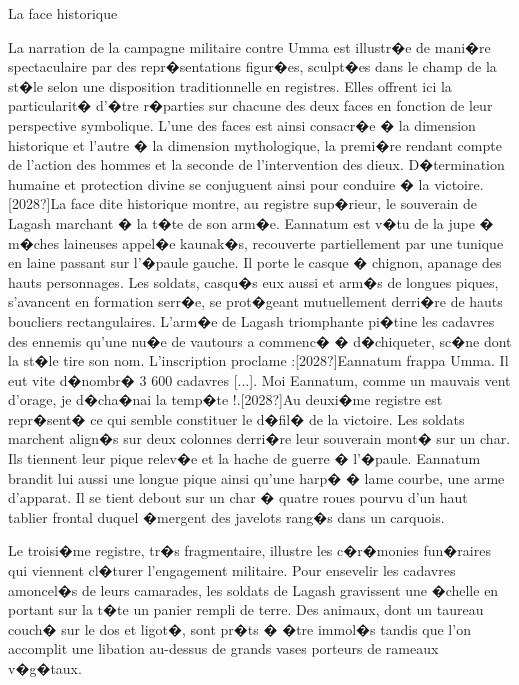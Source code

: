 \documentclass{article}
\begin{document}
La face {\textquotedbl}historique{\textquotedbl}

La narration de la campagne militaire contre Umma est illustr�e de mani�re spectaculaire par des repr�sentations figur�es, sculpt�es dans le champ de la st�le selon une disposition traditionnelle en registres. Elles offrent ici la particularit� d'�tre r�parties sur chacune des deux faces en fonction de leur perspective symbolique. L'une des faces est ainsi consacr�e � la dimension {\textquotedbl}historique{\textquotedbl} et l'autre � la dimension {\textquotedbl}mythologique{\textquotedbl}, la premi�re rendant compte de l'action des hommes et la seconde de l'intervention des dieux. D�termination humaine et protection divine se conjuguent ainsi pour conduire � la victoire.[2028?]La face dite {\textquotedbl}historique{\textquotedbl} montre, au registre sup�rieur, le souverain de Lagash marchant � la t�te de son arm�e. Eannatum est v�tu de la jupe � m�ches laineuses appel�e kaunak�s, recouverte partiellement par une tunique en laine passant sur l'�paule gauche. Il porte le casque � chignon, apanage des hauts personnages. Les soldats, casqu�s eux aussi et arm�s de longues piques, s'avancent en formation serr�e, se prot�geant mutuellement derri�re de hauts boucliers rectangulaires. L'arm�e de Lagash triomphante pi�tine les cadavres des ennemis qu'une nu�e de vautours a commenc� � d�chiqueter, sc�ne dont la st�le tire son nom. L'inscription proclame :[2028?]{\textquotedbl}Eannatum frappa Umma. Il eut vite d�nombr� 3 600 cadavres [...]. Moi Eannatum, comme un mauvais vent d'orage, je d�cha�nai la temp�te !{\textquotedbl}.[2028?]Au deuxi�me registre est repr�sent� ce qui semble constituer le d�fil� de la victoire. Les soldats marchent align�s sur deux colonnes derri�re leur souverain mont� sur un char. Ils tiennent leur pique relev�e et la hache de guerre � l'�paule. Eannatum brandit lui aussi une longue pique ainsi qu'une harp� � lame courbe, une arme d'apparat. Il se tient debout sur un char � quatre roues pourvu d'un haut tablier frontal duquel �mergent des javelots rang�s dans un carquois.

Le troisi�me registre, tr�s fragmentaire, illustre les c�r�monies fun�raires qui viennent cl�turer l'engagement militaire. Pour ensevelir les cadavres amoncel�s de leurs camarades, les soldats de Lagash gravissent une �chelle en portant sur la t�te un panier rempli de terre. Des animaux, dont un taureau couch� sur le dos et ligot�, sont pr�ts � �tre immol�s tandis que l'on accomplit une libation au-dessus de grands vases porteurs de rameaux v�g�taux.
\end{document}
